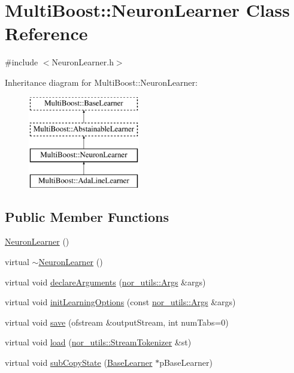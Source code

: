 \hypertarget{classMultiBoost_1_1NeuronLearner}{
\section{MultiBoost::NeuronLearner Class Reference}
\label{classMultiBoost_1_1NeuronLearner}
}


{\ttfamily \#include $<$NeuronLearner.h$>$}

Inheritance diagram for MultiBoost::NeuronLearner:\begin{figure}[H]
\begin{center}
\leavevmode
\includegraphics[height=4.000000cm]{classMultiBoost_1_1NeuronLearner}
\end{center}
\end{figure}
\subsection*{Public Member Functions}
\begin{DoxyCompactItemize}
\item 
\hyperlink{classMultiBoost_1_1NeuronLearner_a257dc3f6eb30d8f97b9858b48a1e9cb3}{NeuronLearner} ()
\item 
virtual \hyperlink{classMultiBoost_1_1NeuronLearner_a5a6f684e0a52cef30a5282f0f50f3534}{$\sim$NeuronLearner} ()
\item 
virtual void \hyperlink{classMultiBoost_1_1NeuronLearner_a8c38489a59616866afbbc9d7ad60fee5}{declareArguments} (\hyperlink{classnor__utils_1_1Args}{nor\_\-utils::Args} \&args)
\item 
virtual void \hyperlink{classMultiBoost_1_1NeuronLearner_a0c5b9fd7ee8dc329a3d36c948fd3a207}{initLearningOptions} (const \hyperlink{classnor__utils_1_1Args}{nor\_\-utils::Args} \&args)
\item 
virtual void \hyperlink{classMultiBoost_1_1NeuronLearner_a0364fe14ddcc5f0c92537909832234c1}{save} (ofstream \&outputStream, int numTabs=0)
\item 
virtual void \hyperlink{classMultiBoost_1_1NeuronLearner_af6853ce2a99be6986c429bcad760d9f9}{load} (\hyperlink{classnor__utils_1_1StreamTokenizer}{nor\_\-utils::StreamTokenizer} \&st)
\item 
virtual void \hyperlink{classMultiBoost_1_1NeuronLearner_a123916b011566aad19552783032a3e30}{subCopyState} (\hyperlink{classMultiBoost_1_1BaseLearner}{BaseLearner} $\ast$pBaseLearner)
\end{DoxyCompactItemize}
